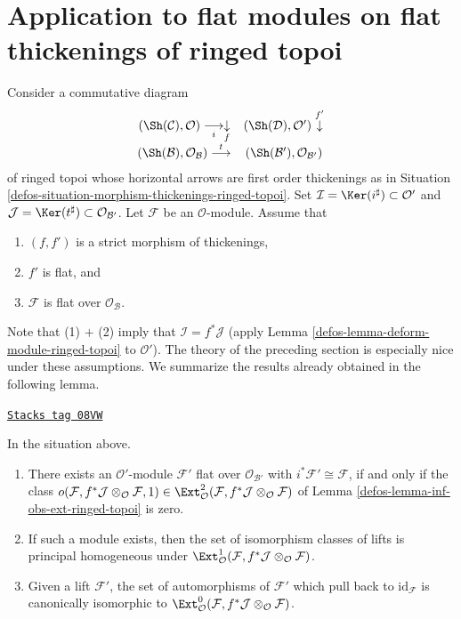 \section{Application to flat modules on flat thickenings of ringed topoi}
\label{defos-section-flat-ringed-topoi}
Consider a commutative diagram
$$
\begin{array}{cc}(\Sh(\mathcal{C}), \mathcal{O}) \underset{i}{\longrightarrow}\underset{f}{\downarrow} & (\Sh(\mathcal{D}), \mathcal{O}') \overset{f'}{\downarrow} \\ (\Sh(\mathcal{B}), \mathcal{O}_\mathcal{B}) \overset{t}{\longrightarrow} & (\Sh(\mathcal{B}'), \mathcal{O}_{\mathcal{B}'})\end{array}
$$
of ringed topoi whose horizontal arrows are first order thickenings
as in Situation \ref{defos-situation-morphism-thickenings-ringed-topoi}. Set
$\mathcal{I} = \Ker(i^\sharp) \subset \mathcal{O}'$ and
$\mathcal{J} = \Ker(t^\sharp) \subset \mathcal{O}_{\mathcal{B}'}$.
Let $\mathcal{F}$ be an $\mathcal{O}$-module. Assume that
\begin{enumerate}
\item $(f, f')$ is a strict morphism of thickenings,
\item $f'$ is flat, and
\item $\mathcal{F}$ is flat over $\mathcal{O}_\mathcal{B}$.
\end{enumerate}
Note that (1) $+$ (2) imply that $\mathcal{I} = f^*\mathcal{J}$
(apply Lemma \ref{defos-lemma-deform-module-ringed-topoi} to $\mathcal{O}'$).
The theory of the preceding section is especially nice
under these assumptions. We summarize the results already obtained
in the following lemma.

\begin{lemma}
\label{defos-lemma-flat-ringed-topoi}
\href{https://stacks.math.columbia.edu/tag/08VW}{\texttt{Stacks tag 08VW}}

In the situation above.
\begin{enumerate}
\item There exists an $\mathcal{O}'$-module $\mathcal{F}'$ flat over
$\mathcal{O}_{\mathcal{B}'}$ with $i^*\mathcal{F}' \cong \mathcal{F}$,
if and only if
the class $o(\mathcal{F}, f^*\mathcal{J} \otimes_\mathcal{O} \mathcal{F}, 1)
\in \Ext^2_\mathcal{O}(
\mathcal{F}, f^*\mathcal{J} \otimes_\mathcal{O} \mathcal{F})$
of Lemma \ref{defos-lemma-inf-obs-ext-ringed-topoi} is zero.
\item If such a module exists, then the set of isomorphism classes
of lifts is principal homogeneous under
$\Ext^1_\mathcal{O}(
\mathcal{F}, f^*\mathcal{J} \otimes_\mathcal{O} \mathcal{F})$.
\item Given a lift $\mathcal{F}'$, the set of automorphisms of
$\mathcal{F}'$ which pull back to $\text{id}_\mathcal{F}$ is canonically
isomorphic to $\Ext^0_\mathcal{O}(
\mathcal{F}, f^*\mathcal{J} \otimes_\mathcal{O} \mathcal{F})$.
\end{enumerate}
\end{lemma}

